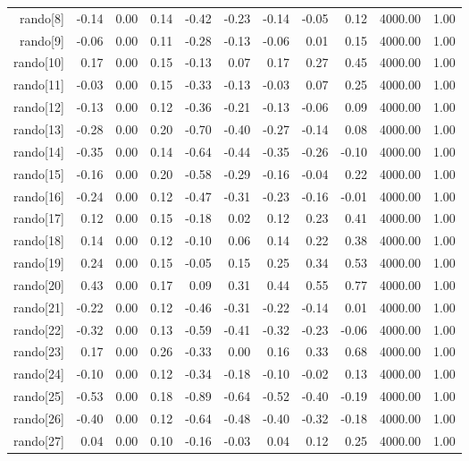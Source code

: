 \begin{table}[ht]
\begin{tabular}{rrrrrrrrrrr}
  rando[8] & -0.14 & 0.00 & 0.14 & -0.42 & -0.23 & -0.14 & -0.05 & 0.12 & 4000.00 & 1.00 \\ 
  rando[9] & -0.06 & 0.00 & 0.11 & -0.28 & -0.13 & -0.06 & 0.01 & 0.15 & 4000.00 & 1.00 \\ 
  rando[10] & 0.17 & 0.00 & 0.15 & -0.13 & 0.07 & 0.17 & 0.27 & 0.45 & 4000.00 & 1.00 \\ 
  rando[11] & -0.03 & 0.00 & 0.15 & -0.33 & -0.13 & -0.03 & 0.07 & 0.25 & 4000.00 & 1.00 \\ 
  rando[12] & -0.13 & 0.00 & 0.12 & -0.36 & -0.21 & -0.13 & -0.06 & 0.09 & 4000.00 & 1.00 \\ 
  rando[13] & -0.28 & 0.00 & 0.20 & -0.70 & -0.40 & -0.27 & -0.14 & 0.08 & 4000.00 & 1.00 \\ 
  rando[14] & -0.35 & 0.00 & 0.14 & -0.64 & -0.44 & -0.35 & -0.26 & -0.10 & 4000.00 & 1.00 \\ 
  rando[15] & -0.16 & 0.00 & 0.20 & -0.58 & -0.29 & -0.16 & -0.04 & 0.22 & 4000.00 & 1.00 \\ 
  rando[16] & -0.24 & 0.00 & 0.12 & -0.47 & -0.31 & -0.23 & -0.16 & -0.01 & 4000.00 & 1.00 \\ 
  rando[17] & 0.12 & 0.00 & 0.15 & -0.18 & 0.02 & 0.12 & 0.23 & 0.41 & 4000.00 & 1.00 \\ 
  rando[18] & 0.14 & 0.00 & 0.12 & -0.10 & 0.06 & 0.14 & 0.22 & 0.38 & 4000.00 & 1.00 \\ 
  rando[19] & 0.24 & 0.00 & 0.15 & -0.05 & 0.15 & 0.25 & 0.34 & 0.53 & 4000.00 & 1.00 \\ 
  rando[20] & 0.43 & 0.00 & 0.17 & 0.09 & 0.31 & 0.44 & 0.55 & 0.77 & 4000.00 & 1.00 \\ 
  rando[21] & -0.22 & 0.00 & 0.12 & -0.46 & -0.31 & -0.22 & -0.14 & 0.01 & 4000.00 & 1.00 \\ 
  rando[22] & -0.32 & 0.00 & 0.13 & -0.59 & -0.41 & -0.32 & -0.23 & -0.06 & 4000.00 & 1.00 \\ 
  rando[23] & 0.17 & 0.00 & 0.26 & -0.33 & 0.00 & 0.16 & 0.33 & 0.68 & 4000.00 & 1.00 \\ 
  rando[24] & -0.10 & 0.00 & 0.12 & -0.34 & -0.18 & -0.10 & -0.02 & 0.13 & 4000.00 & 1.00 \\ 
  rando[25] & -0.53 & 0.00 & 0.18 & -0.89 & -0.64 & -0.52 & -0.40 & -0.19 & 4000.00 & 1.00 \\ 
  rando[26] & -0.40 & 0.00 & 0.12 & -0.64 & -0.48 & -0.40 & -0.32 & -0.18 & 4000.00 & 1.00 \\ 
  rando[27] & 0.04 & 0.00 & 0.10 & -0.16 & -0.03 & 0.04 & 0.12 & 0.25 & 4000.00 & 1.00 \\ 

\end{tabular}
\end{table}

